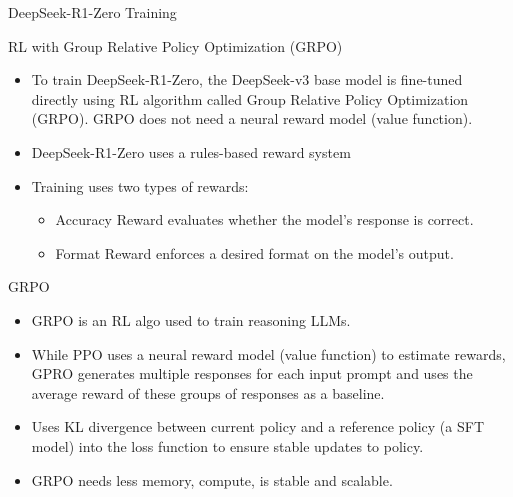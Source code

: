 \begin{frame}[fragile]{DeepSeek-R1-Zero Training}

RL with Group Relative Policy Optimization (GRPO)

    \begin{itemize}
        \item  To train DeepSeek-R1-Zero, the DeepSeek-v3 base model is fine-tuned 
directly using RL algorithm called Group Relative Policy Optimization 
(GRPO). GRPO does not need a neural reward model (value function).
        \item   DeepSeek-R1-Zero uses a rules-based reward system 
		\item Training uses two types of rewards:
		    \begin{itemize}
				\item   Accuracy Reward evaluates whether the model's response is correct.
				\item   Format Reward  enforces a desired format on the model's output.  
		    \end{itemize}

    \end{itemize}
\end{frame}

\begin{frame}[fragile]{GRPO}


    \begin{itemize}
        \item   GRPO is an RL algo used to train reasoning LLMs. 
        \item   While PPO uses a neural reward model (value function) to estimate 
rewards, GPRO generates multiple responses for each input prompt and 
uses the average reward of these groups of responses as a baseline.  
        \item   Uses KL divergence between current policy and a reference policy (a 
SFT model) into the loss function to ensure stable updates to policy.
        \item   GRPO needs less memory, compute, is stable and scalable. 
    \end{itemize}
\end{frame}


